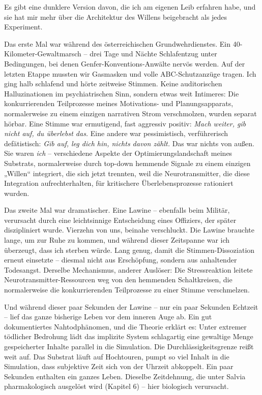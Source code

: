 \documentclass[11pt, twoside, openright]{book}
\begin{document}
Es gibt eine dunklere Version davon, die ich am eigenen Leib erfahren habe, und sie hat mir mehr über die Architektur des Willens beigebracht als jedes Experiment.

Das erste Mal war während des österreichischen Grundwehrdienstes. Ein 40-Kilometer-Gewaltmarsch -- drei Tage und Nächte Schlafentzug unter Bedingungen, bei denen Genfer-Konventions-Anwälte nervös werden. Auf der letzten Etappe mussten wir Gasmasken und volle ABC-Schutzanzüge tragen. Ich ging halb schlafend und hörte zeitweise Stimmen. Keine auditorischen Halluzinationen im psychiatrischen Sinn, sondern etwas weit Intimeres: Die konkurrierenden Teilprozesse meines Motivations- und Planungsapparats, normalerweise zu einem einzigen narrativen Strom verschmolzen, wurden separat hörbar. Eine Stimme war ermutigend, fast aggressiv positiv: \textit{Mach weiter, gib nicht auf, du überlebst das.} Eine andere war pessimistisch, verführerisch defätistisch: \textit{Gib auf, leg dich hin, nichts davon zählt.} Das war nichts von außen. Sie waren \textit{ich} -- verschiedene Aspekte der Optimierungslandschaft meines Substrats, normalerweise durch top-down hemmende Signale zu einem einzigen „Willen“ integriert, die sich jetzt trennten, weil die Neurotransmitter, die diese Integration aufrechterhalten, für kritischere Überlebensprozesse rationiert wurden.

Das zweite Mal war dramatischer. Eine Lawine -- ebenfalls beim Militär, verursacht durch eine leichtsinnige Entscheidung eines Offiziers, der später diszipliniert wurde. Vierzehn von uns, beinahe verschluckt. Die Lawine brauchte lange, um zur Ruhe zu kommen, und während dieser Zeitspanne war ich überzeugt, dass ich sterben würde. Lang genug, damit die Stimmen-Dissoziation erneut einsetzte -- diesmal nicht aus Erschöpfung, sondern aus anhaltender Todesangst. Derselbe Mechanismus, anderer Auslöser: Die Stressreaktion leitete Neurotransmitter-Ressourcen weg von den hemmenden Schaltkreisen, die normalerweise die konkurrierenden Teilprozesse zu einer Stimme verschmelzen.

Und während dieser paar Sekunden der Lawine -- nur ein paar Sekunden Echtzeit -- lief das ganze bisherige Leben vor dem inneren Auge ab. Ein gut dokumentiertes Nahtodphänomen, und die Theorie erklärt es: Unter extremer tödlicher Bedrohung lädt das implizite System schlagartig eine gewaltige Menge gespeicherter Inhalte parallel in die Simulation. Die Durchlässigkeitsgrenze reißt weit auf. Das Substrat läuft auf Hochtouren, pumpt so viel Inhalt in die Simulation, dass subjektive Zeit sich von der Uhrzeit abkoppelt. Ein paar Sekunden enthalten ein ganzes Leben. Dieselbe Zeitdehnung, die unter Salvia pharmakologisch ausgelöst wird (Kapitel 6) -- hier biologisch verursacht.
\end{document}
